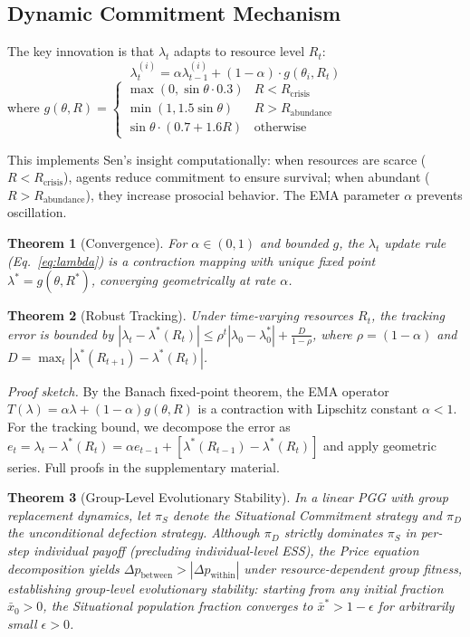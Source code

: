 \documentclass{article}
\newtheorem{theorem}{Theorem}
\begin{document}
\subsection{Dynamic Commitment Mechanism}

The key innovation is that $\lambda_t$ adapts to resource level $R_t$:
\begin{equation}
\lambda_t^{(i)} = \alpha \lambda_{t-1}^{(i)} + (1-\alpha) \cdot g(\theta_i, R_t)
\label{eq:lambda}
\end{equation}
where $g(\theta, R) = \begin{cases}
\max(0, \sin\theta \cdot 0.3) & R < R_{\text{crisis}} \\
\min(1, 1.5\sin\theta) & R > R_{\text{abundance}} \\
\sin\theta \cdot (0.7 + 1.6R) & \text{otherwise}
\end{cases}$

\noindent This implements Sen's insight computationally: when resources are scarce ($R < R_{\text{crisis}}$), agents reduce commitment to ensure survival; when abundant ($R > R_{\text{abundance}}$), they increase prosocial behavior. The EMA parameter $\alpha$ prevents oscillation.

\begin{theorem}[Convergence]
\label{thm:convergence}
For $\alpha \in (0,1)$ and bounded $g$, the $\lambda_t$ update rule (Eq.~\ref{eq:lambda}) is a contraction mapping with unique fixed point $\lambda^* = g(\theta, R^*)$, converging geometrically at rate $\alpha$.
\end{theorem}

\begin{theorem}[Robust Tracking]
\label{thm:tracking}
Under time-varying resources $R_t$, the tracking error is bounded by $|\lambda_t - \lambda^*(R_t)| \le \rho^t |\lambda_0 - \lambda^*_0| + \frac{D}{1-\rho}$, where $\rho = (1-\alpha)$ and $D = \max_t |\lambda^*(R_{t+1}) - \lambda^*(R_t)|$.
\end{theorem}

\noindent \textit{Proof sketch.} By the Banach fixed-point theorem, the EMA operator $T(\lambda) = \alpha \lambda + (1-\alpha)g(\theta, R)$ is a contraction with Lipschitz constant $\alpha < 1$. For the tracking bound, we decompose the error as $e_t = \lambda_t - \lambda^*(R_t) = \alpha e_{t-1} + [\lambda^*(R_{t-1}) - \lambda^*(R_t)]$ and apply geometric series. Full proofs in the supplementary material.

\begin{theorem}[Group-Level Evolutionary Stability]
\label{thm:group_ess}
In a linear PGG with group replacement dynamics, let $\pi_S$ denote the Situational Commitment strategy and $\pi_D$ the unconditional defection strategy. Although $\pi_D$ strictly dominates $\pi_S$ in per-step individual payoff (precluding individual-level ESS), the Price equation decomposition yields $\Delta p_{\text{between}} > |\Delta p_{\text{within}}|$ under resource-dependent group fitness, establishing group-level evolutionary stability: starting from any initial fraction $\bar{x}_0 > 0$, the Situational population fraction converges to $\bar{x}^* > 1 - \epsilon$ for arbitrarily small $\epsilon > 0$.
\end{theorem}
\end{document}
